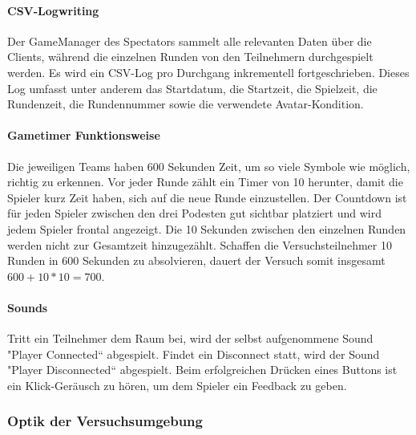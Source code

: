 \documentclass[a4paper,11pt]{article}%
\renewcommand{\\}{\vspace*{0.5\baselineskip} \newline}
\begin{document}
{{\paragraph{CSV-Logwriting}
Der GameManager des Spectators sammelt alle relevanten Daten über die Clients, während die einzelnen Runden von den Teilnehmern durchgespielt werden. Es wird ein CSV-Log pro Durchgang inkrementell fortgeschrieben. Dieses Log umfasst unter anderem das Startdatum, die Startzeit, die Spielzeit, die Rundenzeit, die Rundennummer sowie die verwendete Avatar-Kondition.

\paragraph{Gametimer Funktionsweise}
Die jeweiligen Teams haben 600 Sekunden Zeit, um so viele Symbole wie möglich, richtig zu erkennen. Vor jeder Runde zählt ein Timer von 10 herunter, damit die Spieler kurz Zeit haben, sich auf die neue Runde einzustellen. Der Countdown ist für jeden Spieler zwischen den drei Podesten gut sichtbar platziert und wird jedem Spieler frontal angezeigt. Die 10 Sekunden zwischen den einzelnen Runden werden nicht zur Gesamtzeit hinzugezählt. Schaffen die Versuchsteilnehmer 10 Runden in 600 Sekunden zu absolvieren, dauert der Versuch somit insgesamt \\
$600 + 10 * 10 = 700$.

\paragraph{Sounds}
Tritt ein Teilnehmer dem Raum bei, wird der selbst aufgenommene Sound "Player
Connected“ abgespielt. Findet ein Disconnect statt, wird der Sound "Player
Disconnected“ abgespielt. Beim erfolgreichen Drücken eines Buttons ist ein Klick-Geräusch zu hören, um dem Spieler ein Feedback zu geben. 

\newpage	
\subsubsection{Optik der Versuchsumgebung}
}}
\end{document}
